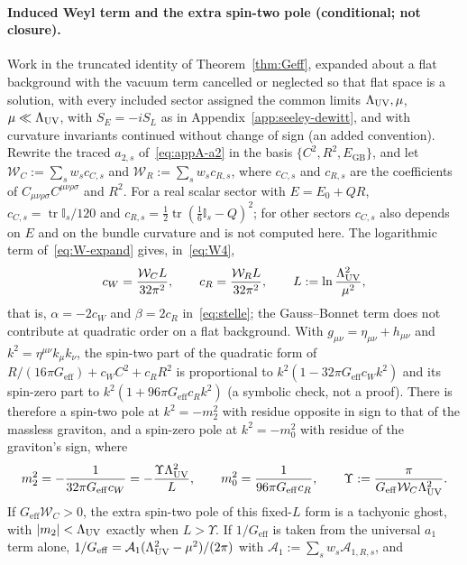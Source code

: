 \paragraph{Induced Weyl term and the extra spin-two pole (conditional; not closure).}
Work in the truncated identity of Theorem~\ref{thm:Geff}, expanded about
a flat background with the vacuum term cancelled or neglected so that
flat space is a solution, with every included sector assigned the common
limits \(\Lambda_{\mathrm{UV}},\mu\), \(\mu\ll\Lambda_{\mathrm{UV}}\), with \(S_E=-iS_L\) as in
Appendix~\ref{app:seeley-dewitt}, and with curvature invariants
continued without change of sign (an added convention). Rewrite the
traced \(a_{2,s}\) of~\eqref{eq:appA-a2} in the basis
\(\{C^2,R^2,E_{\mathrm{GB}}\}\), and let
\(\mathcal W_C:=\sum_sw_sc_{C,s}\) and \(\mathcal W_R:=\sum_sw_sc_{R,s}\),
where \(c_{C,s}\) and \(c_{R,s}\) are the coefficients of
\(C_{\mu\nu\rho\sigma}C^{\mu\nu\rho\sigma}\) and \(R^2\). For a real
scalar sector with \(E=E_0+QR\), \(c_{C,s}=\operatorname{tr}\mathbb I_s/120\)
and \(c_{R,s}=\tfrac12\operatorname{tr}(\tfrac16\mathbb I_s-Q)^2\); for
other sectors \(c_{C,s}\) also depends on \(E\) and on the bundle
curvature and is not computed here. The logarithmic term
of~\eqref{eq:W-expand} gives, in~\eqref{eq:W4},
\[
  c_W=\frac{\mathcal W_C L}{32\pi^2},\qquad
  c_R=\frac{\mathcal W_R L}{32\pi^2},\qquad
  L:=\ln\frac{\Lambda_{\mathrm{UV}}^2}{\mu^2},
\]
that is, \(\alpha=-2c_W\) and \(\beta=2c_R\) in~\eqref{eq:stelle}; the
Gauss--Bonnet term does not contribute at quadratic order on a flat
background. With \(g_{\mu\nu}=\eta_{\mu\nu}+h_{\mu\nu}\) and
\(k^2=\eta^{\mu\nu}k_\mu k_\nu\), the spin-two part of the quadratic form
of \(R/(16\pi G_{\mathrm{eff}})+c_WC^2+c_RR^2\) is proportional to
\(k^2(1-32\pi G_{\mathrm{eff}}c_Wk^2)\) and its spin-zero part to
\(k^2(1+96\pi G_{\mathrm{eff}}c_Rk^2)\) (a symbolic check, not a proof).
There is therefore a spin-two pole at \(k^2=-m_2^2\) with residue
opposite in sign to that of the massless graviton, and a spin-zero pole
at \(k^2=-m_0^2\) with residue of the graviton's sign, where
\[
  m_2^2=-\frac{1}{32\pi G_{\mathrm{eff}}c_W}
       =-\frac{\Upsilon\Lambda_{\mathrm{UV}}^2}{L},
  \qquad
  m_0^2=\frac{1}{96\pi G_{\mathrm{eff}}c_R},
  \qquad
  \Upsilon:=\frac{\pi}{G_{\mathrm{eff}}\mathcal W_C\Lambda_{\mathrm{UV}}^2}.
\]
If \(G_{\mathrm{eff}}\mathcal W_C>0\), the extra spin-two pole of this
fixed-\(L\) form is a tachyonic ghost, with \(|m_2|<\Lambda_{\mathrm{UV}}\) exactly when
\(L>\Upsilon\). If \(1/G_{\mathrm{eff}}\) is taken from the
universal \(a_1\) term alone, \(1/G_{\mathrm{eff}}
=\mathcal A_1(\Lambda_{\mathrm{UV}}^2-\mu^2)/(2\pi)\) with
\(\mathcal A_1:=\sum_sw_s\mathcal A_{1,R,s}\), and

